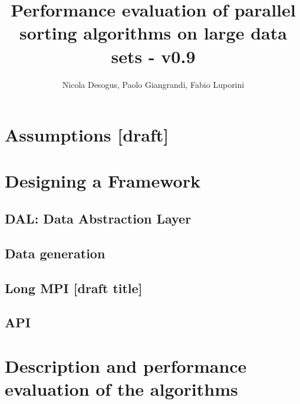\documentclass[a4paper,12pt,oneside,openright]{article}
\title{Performance evaluation of parallel sorting algorithms on large data sets - v0.9}
\author{Nicola Desogus, Paolo Giangrandi, Fabio Luporini}
\begin{document}
\maketitle
\tableofcontents
\pagebreak





\section{Assumptions [draft]}


\section{Designing a Framework}

\subsection{DAL: Data Abstraction Layer}

\subsection{Data generation}
\subsection{Long MPI [draft title]}
\subsection{API}



\pagebreak

\section{Description and performance evaluation of the algorithms}















                                                                    

%

\end{document}

